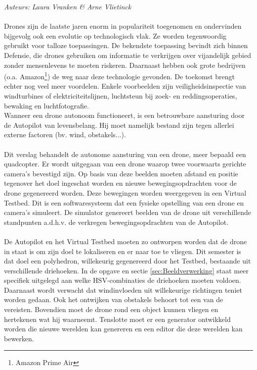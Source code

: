 {\em Auteurs: Laura Vranken \& Arne Vlietinck}
\\\\
\noindent
Drones zijn de laatste jaren enorm in populariteit toegenomen en ondervinden bijgevolg ook een evolutie op technologisch vlak. Ze worden tegenwoordig gebruikt voor talloze toepassingen. De bekendste toepassing bevindt zich binnen Defensie, die drones gebruiken om informatie te verkrijgen over vijandelijk gebied zonder mensenlevens te moeten riskeren. Daarnaast hebben ook grote bedrijven (o.a. Amazon\footnote{Amazon Prime Air}) de weg naar deze technologie gevonden. De toekomst brengt echter nog veel meer voordelen. Enkele voorbeelden  \cite{website:microdrones} zijn veiligheidsinspectie van windturbines of elektriciteitslijnen, luchtsteun bij zoek- en reddingsoperaties, bewaking en luchtfotografie.
\\
Wanneer een drone autonoom functioneert, is een betrouwbare aansturing door de Autopilot van levensbelang. Hij moet namelijk bestand zijn tegen allerlei externe factoren (bv. wind, obstakels...).
\\
\\
Dit verslag behandelt de autonome aansturing van een drone, meer bepaald een quadcopter. Er wordt uitgegaan van een drone waarop twee voorwaarts gerichte camera's bevestigd zijn. Op basis van deze beelden moeten afstand en positie tegenover het doel ingeschat worden en nieuwe bewegingsopdrachten voor de drone gegenereerd worden. Deze bewegingen worden weergegeven in een Virtual Testbed. Dit is een softwaresysteem dat een fysieke opstelling van een drone en camera's simuleert. De simulator genereert beelden van de drone uit verschillende standpunten a.d.h.v. de verkregen bewegingsopdrachten van de Autopilot. 
\\
\\
De Autopilot en het Virtual Testbed moeten zo ontworpen worden dat de drone in staat is om zijn doel te lokaliseren en er naar toe te vliegen. Dit semester is dat doel een polyhedron, willekeurig gegenereerd door het Testbed, bestaande uit verschillende driehoeken. In de opgave en sectie \ref{sec:Beeldverwerking} staat meer specifiek uitgelegd aan welke HSV-combinaties de driehoeken moeten voldoen. Daarnaast wordt verwacht dat windinvloeden uit willekeurige richtingen teniet worden gedaan. Ook het ontwijken van obstakels behoort tot een van de vereisten. Bovendien moet de drone rond een object kunnen vliegen en hertekenen wat hij waarneemt. Tenslotte moet er een generator ontwikkeld worden die nieuwe werelden kan genereren en een editor die deze werelden kan bewerken.
